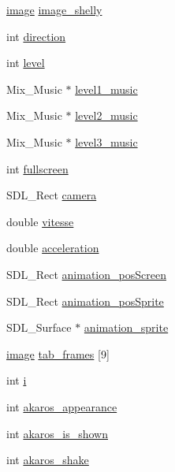 \begin{DoxyCompactItemize}
\item 
\hyperlink{structimage}{image} \hyperlink{structbackground_a88f807fe03a16e18c601cdcf83ebddea}{image\+\_\+shelly}
\item 
int \hyperlink{structbackground_a4c0f0e05fd346e685fca2f07b482f4b5}{direction}
\item 
int \hyperlink{structbackground_afb94a1dc7a42d1aacf95de28ae76b1fe}{level}
\item 
Mix\+\_\+\+Music $\ast$ \hyperlink{structbackground_a9876f215d7d8042b36c4670340059a76}{level1\+\_\+music}
\item 
Mix\+\_\+\+Music $\ast$ \hyperlink{structbackground_a06803aff4548d44c8ef65396f262eba2}{level2\+\_\+music}
\item 
Mix\+\_\+\+Music $\ast$ \hyperlink{structbackground_ab1d0acc82174081d3a3c8f422a69a802}{level3\+\_\+music}
\item 
int \hyperlink{structbackground_a8942f57c28b449f11544378237b3193c}{fullscreen}
\item 
S\+D\+L\+\_\+\+Rect \hyperlink{structbackground_a71bbbffa05a377b142caee07ffa54833}{camera}
\item 
double \hyperlink{structbackground_a6585242e38afc14d33512807d0a0c37f}{vitesse}
\item 
double \hyperlink{structbackground_a457498e3187247c1af1491513c7d0f1a}{acceleration}
\item 
S\+D\+L\+\_\+\+Rect \hyperlink{structbackground_af8d0479a0e78dba6400e3129a3e9fd99}{animation\+\_\+pos\+Screen}
\item 
S\+D\+L\+\_\+\+Rect \hyperlink{structbackground_add4c6a595a4a57d2d5a9fa2c8ee59ad5}{animation\+\_\+pos\+Sprite}
\item 
S\+D\+L\+\_\+\+Surface $\ast$ \hyperlink{structbackground_a6c0a5a9afca11516c94364cd86e9619c}{animation\+\_\+sprite}
\item 
\hyperlink{structimage}{image} \hyperlink{structbackground_a6e15278cd1578b2041fb0f4c0d7f2d89}{tab\+\_\+frames} \mbox{[}9\mbox{]}
\item 
int \hyperlink{structbackground_a59ac2f68be9169f063bcd8caf00689ad}{i}
\item 
int \hyperlink{structbackground_aa04607c52132818019f45bad76948694}{akaros\+\_\+appearance}
\item 
int \hyperlink{structbackground_aea21f89727fe1cad87642d4f5e646f02}{akaros\+\_\+is\+\_\+shown}
\item 
int \hyperlink{structbackground_a5a04c0dba122c1a1a8318b6dd89928ae}{akaros\+\_\+shake}
\item 

\end{DoxyCompactItemize}
